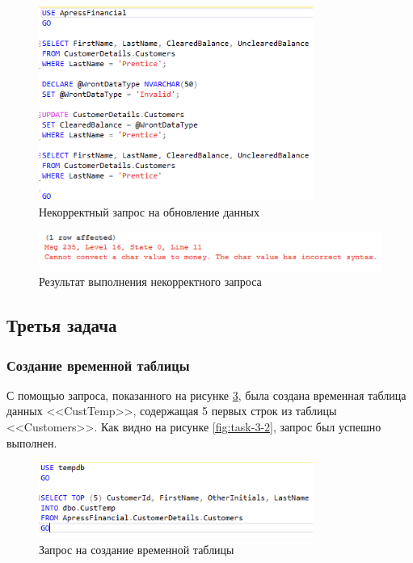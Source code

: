 \documentclass[a4paper, 14pt]{extarticle}
\begin{document}
\begin{figure}[H]
  \centering
  \includegraphics[width=0.8\textwidth]{images/task-2/7.png}
  \caption{Некорректный запрос на обновление данных}
  \label{fig:task-2-7}
\end{figure}

\begin{figure}[H]
  \centering
  \includegraphics[width=\textwidth]{images/task-2/8.png}
  \caption{Результат выполнения некорректного запроса}
  \label{fig:task-2-8}
\end{figure}

\subsection{Третья задача}

\subsubsection{Создание временной таблицы}

С помощью запроса, показанного на рисунке \ref{fig:task-3-1}, была создана
временная таблица данных <<\foreignlanguage{english}{CustTemp}>>, содержащая 5
первых строк из таблицы <<\foreignlanguage{english}{Customers}>>. Как видно на
рисунке \ref{fig:task-3-2}, запрос был успешно выполнен.

\begin{figure}[H]
  \centering
  \includegraphics[width=0.8\textwidth]{images/task-3/1.png}
  \caption{Запрос на создание временной таблицы}
  \label{fig:task-3-1}
\end{figure}
\end{document}
